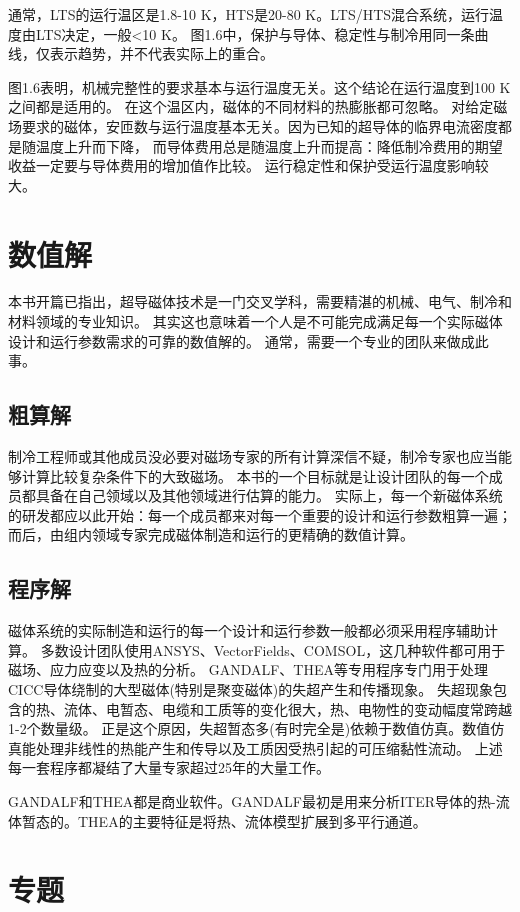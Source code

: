 通常，LTS的运行温区是1.8-10 K，HTS是20-80 K。LTS/HTS混合系统，运行温度由LTS决定，一般<10 K。
图1.6中，保护与导体、稳定性与制冷用同一条曲线，仅表示趋势，并不代表实际上的重合。

图1.6表明，机械完整性的要求基本与运行温度无关。这个结论在运行温度到100 K之间都是适用的。
在这个温区内，磁体的不同材料的热膨胀都可忽略。
对给定磁场要求的磁体，安匝数与运行温度基本无关。因为已知的超导体的临界电流密度都是随温度上升而下降，
而导体费用总是随温度上升而提高：降低制冷费用的期望收益一定要与导体费用的增加值作比较。
运行稳定性和保护受运行温度影响较大。

\section{数值解}
本书开篇已指出，超导磁体技术是一门交叉学科，需要精湛的机械、电气、制冷和材料领域的专业知识。
其实这也意味着一个人是不可能完成满足每一个实际磁体设计和运行参数需求的可靠的数值解的。
通常，需要一个专业的团队来做成此事。
\subsection{粗算解}
制冷工程师或其他成员没必要对磁场专家的所有计算深信不疑，制冷专家也应当能够计算比较复杂条件下的大致磁场。
本书的一个目标就是让设计团队的每一个成员都具备在自己领域以及其他领域进行估算的能力。
实际上，每一个新磁体系统的研发都应以此开始：每一个成员都来对每一个重要的设计和运行参数粗算一遍；
而后，由组内领域专家完成磁体制造和运行的更精确的数值计算。

\subsection{程序解}
磁体系统的实际制造和运行的每一个设计和运行参数一般都必须采用程序辅助计算。
多数设计团队使用ANSYS、VectorFields、COMSOL，这几种软件都可用于磁场、应力应变以及热的分析。
GANDALF、THEA等专用程序专门用于处理CICC导体绕制的大型磁体(特别是聚变磁体)的失超产生和传播现象。
失超现象包含的热、流体、电暂态、电缆和工质等的变化很大，热、电物性的变动幅度常跨越1-2个数量级。
正是这个原因，失超暂态多(有时完全是)依赖于数值仿真。数值仿真能处理非线性的热能产生和传导以及工质因受热引起的可压缩黏性流动。
上述每一套程序都凝结了大量专家超过25年的大量工作。

GANDALF和THEA都是商业软件。GANDALF最初是用来分析ITER导体的热-流体暂态的。THEA的主要特征是将热、流体模型扩展到多平行通道。

\section{专题}
